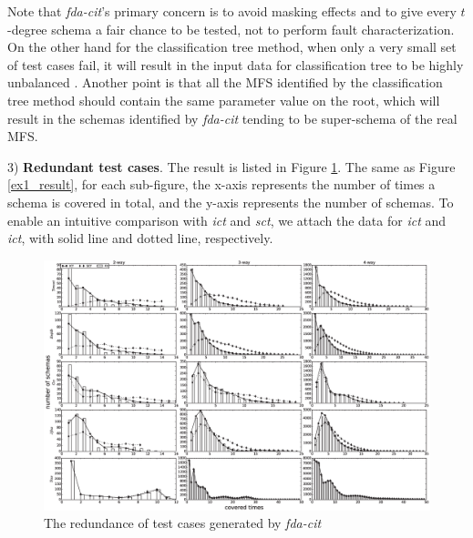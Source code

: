 \documentclass[10pt,journal,compsoc]{IEEEtran}
\begin{document}
Note that \emph{fda-cit}'s primary concern is to avoid masking effects and to give every $t$-degree schema a fair chance to be tested, not to perform fault characterization. On the other hand for the classification tree method, when only a very small set of test cases fail, it will result in the input data for classification tree to be highly unbalanced \cite{zhang2012faulty}. Another point is that all the MFS identified by the classification tree method should contain the same parameter value on the root, which will result in the schemas identified by \emph{fda-cit} tending to be super-schema of the real MFS.

3) \textbf{Redundant test cases}.
The result is listed in Figure \ref{ex2_result}. The same as Figure \ref{ex1_result}, for each sub-figure, the x-axis represents the number of times a schema is covered in total, and the y-axis represents the number of schemas.  To enable an intuitive comparison with \emph{ict} and \emph{sct}, we attach the data for \emph{ict} and \emph{ict}, with solid line and dotted line, respectively.

\begin{figure}[htbp]
 \includegraphics[width=7.0in]{ex2.eps}
\caption{The redundance of test cases generated by \emph{fda-cit}}
\label{ex2_result}
\end{figure}
\end{document}
